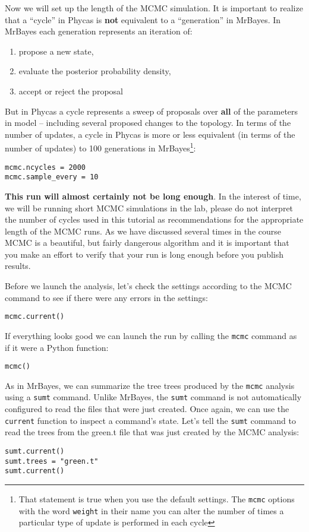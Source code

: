 \documentclass{article}
\newcommand{\cmd}[1]{\texttt{#1}\xspace}
\newcommand{\mb}{MrBayes\xspace}
\newcommand{\phycas}{Phycas\xspace}
\newcommand{\localfile}[1]{\textsf{#1}\xspace}
\begin{document}
Now we will set up the length of the MCMC simulation. 
It is important to realize that a ``cycle'' in \phycas is {\bf not}
equivalent to a ``generation'' in \mb \citep{RonquistH2003}.
In \mb each generation represents an iteration of:
\begin{enumerate}
	\item propose a new state,
	\item evaluate the posterior probability density,
	\item accept or reject the proposal
\end{enumerate}
But in \phycas a cycle represents a sweep of proposals over {\bf all} of the parameters
in model -- including several proposed changes to the topology.
In terms of the number of updates, a cycle in \phycas is more or less equivalent (in terms 
of the number of updates) to 100 generations in \mb\footnote{That statement is true when you use the default settings. 
The \cmd{mcmc} options with the word \cmd{weight} in their name
you can alter the number of times a particular type of update is performed
in each cycle}:
\begin{verbatim}
mcmc.ncycles = 2000
mcmc.sample_every = 10
\end{verbatim}
{\bf This run will almost certainly not be long enough}.
In the interest of time, we will be running short MCMC simulations in the lab, please do
not interpret the number of cycles used in this tutorial 
as recommendations for the appropriate length of the MCMC runs.
As we have discussed several times in the course MCMC is a beautiful, but
fairly dangerous algorithm and it is important that you make an 
effort to verify that your run is long enough before you publish
results.


Before we launch the analysis, let's check the settings according to the MCMC command
to see if there were any errors in the settings:
\begin{verbatim}
mcmc.current()
\end{verbatim}

If everything looks good we can launch the run by calling the \cmd{mcmc} command
as if it were a Python function:
\begin{verbatim}
mcmc()
\end{verbatim}

As in \mb, we can summarize the tree trees produced by the \cmd{mcmc} analysis
using a \cmd{sumt} command.
Unlike \mb, the \cmd{sumt} command is not automatically configured to read the files
that were just created.
Once again, we can use the \cmd{current} function to inspect a command's state.
Let's tell the \cmd{sumt} command to read the trees from the \localfile{green.t} file
that was just created by the MCMC analysis:
\begin{verbatim}
sumt.current()
sumt.trees = "green.t"
sumt.current()
\end{verbatim}
\end{document}
